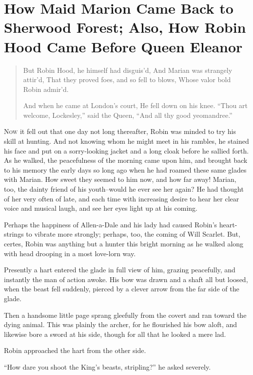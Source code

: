 \chapter{How Maid Marion Came Back to Sherwood Forest; Also, How Robin Hood Came Before Queen Eleanor}

\begin{quote}
But Robin Hood, he himself had disguis’d,
And Marian was strangely attir’d,
That they proved foes, and so fell to blows,
Whose valor bold Robin admir’d.

And when he came at London’s court,
He fell down on his knee.
“Thou art welcome, Lockesley,” said the Queen,
“And all thy good yeomandree.”
\end{quote}

\lettrine{N}{ow} it fell out that one day not long thereafter, Robin was minded to
try his skill at hunting. And not knowing whom he might meet in his
rambles, he stained his face and put on a sorry-looking jacket and a
long cloak before he sallied forth. As he walked, the peacefulness of
the morning came upon him, and brought back to his memory the early days
so long ago when he had roamed these same glades with Marian. How sweet
they seemed to him now, and how far away! Marian, too, the dainty friend
of his youth--would he ever see her again? He had thought of her very
often of late, and each time with increasing desire to hear her clear
voice and musical laugh, and see her eyes light up at his coming.

Perhaps the happiness of Allen-a-Dale and his lady had caused Robin's
heart-strings to vibrate more strongly; perhaps, too, the coming of Will
Scarlet. But, certes, Robin was anything but a hunter this bright
morning as he walked along with head drooping in a most love-lorn way.

Presently a hart entered the glade in full view of him, grazing
peacefully, and instantly the man of action awoke. His bow was drawn and
a shaft all but loosed, when the beast fell suddenly, pierced by a
clever arrow from the far side of the glade.

Then a handsome little page sprang gleefully from the covert and ran
toward the dying animal. This was plainly the archer, for he flourished
his bow aloft, and likewise bore a sword at his side, though for all
that he looked a mere lad.

Robin approached the hart from the other side.

``How dare you shoot the King's beasts, stripling?'' he asked severely.


